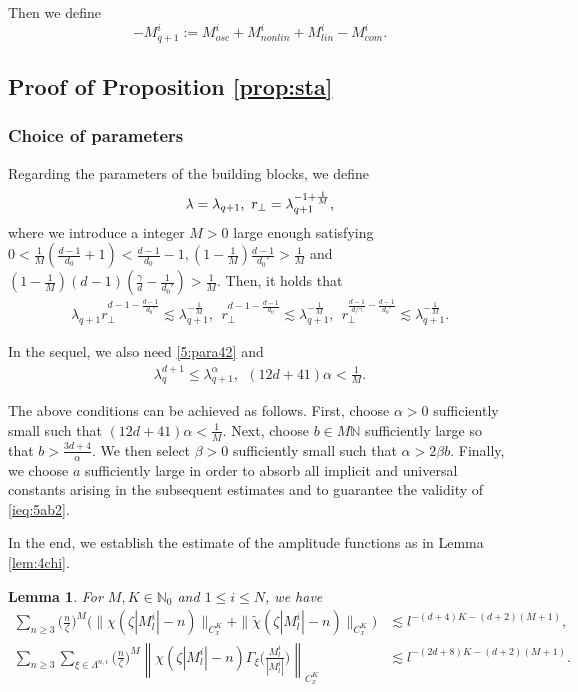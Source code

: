 \documentclass[UTF-8,reqno]{amsart}
\numberwithin{equation}{section}
\newtheorem{lemma}[theorem]{Lemma}
\theoremstyle{definition}
\def\({{\Big(}}
\def\){{\Big)}}
\newcommand{\norm}[1]{\left\|#1\right\|}
\def\geq{\geqslant}
\def\leq{\leqslant}
\def\({{\Big(}}
\def\){{\Big)}}
\def\bl{\begin{lemma}}
\def\el{\end{lemma}}
\def\geq{\geqslant}
\def\leq{\leqslant}
\begin{document}
Then we define 
$$-{M}^i _{q+1}:=M^i_{osc}+M^i_{nonlin}+M^i_{lin}-M^i_{com} .$$ 




\subsection{ Proof of Proposition \ref{prop:sta}}\label{sec:proof1}

\subsubsection{Choice of parameters}\label{sec:5choicepara}

 
Regarding the parameters of the building blocks, we define 
\begin{align}
  \lambda=\lambda_{q+1},\ r_\perp=\lambda_{q+1}^{-1+\frac1{M}}, \notag
\end{align}
where   we introduce a integer $M>0$ large enough  satisfying $0< \frac1M(\frac{d-1}{d_0}+1)<\frac{d-1}{d_0}-1, (1-\frac{1}{M})\frac{d-1}{d_0'}>\frac{1}{M}$ and $(1-\frac{1}{M})(d-1)(\frac{\gamma}{d}-\frac{1}{d_0'})>\frac{1}{M}$.   Then, it holds that 
\begin{align}
    \lambda_{q+1}r_\perp^{d-1-\frac{d-1}{d_0'}}\lesssim \lambda_{q+1}^{-\frac{1}{M}},\  \ r_\perp^{d-1-\frac{d-1}{d_0}}\lesssim\lambda_{q+1}^{-\frac{1}{M}},\ \   r_\perp^{\frac{d-1}{d/\gamma}-\frac{d-1}{d_0'}}\lesssim\lambda_{q+1}^{-\frac1M}.\label{para5lam}
\end{align}
 

In the sequel, we also need \eqref{5:para42} and \begin{align}
   \lambda_{q}^{ d+1}\leq\lambda_{q+1}^\alpha,\ \ (12d+41)\alpha<\frac1M. \label{para55}
 \end{align} 

 The above conditions can be achieved as follows. 
First, choose $\alpha>0$ sufficiently small such that $(12d+41)\alpha<\frac1M.$ Next, choose $b\in M\mathbb{N}$ sufficiently large so that
$b>\frac{3d+4}{\alpha}.$ We then select
$\beta>0$ sufficiently small such that
$\alpha>2\beta b.$ Finally, we choose
$a$ sufficiently large in order to absorb all implicit and universal constants arising in the subsequent estimates and to guarantee the validity of \eqref{ieq:5ab2}.  


 
In the end, we establish the estimate of the amplitude functions  as in Lemma \ref{lem:4chi}.
\bl\label{lem:5chi} 
 For $ M,K\in\mathbb{N}_0$ and $1\leq i\leq N$, we have
\begin{align*}
    \sum_{n\geq3} \(\frac{n}{\zeta }\)^M\(\|\chi(\zeta |M^i_l|-n)\|_{C_{x}^K}+ \|\tilde{\chi}(\zeta |M^i_l|-n)\|_{C_{x}^K}\)&\lesssim l^{- (d+4)K-(d+2)(M+1)},\\
     \sum_{n\geq3}\sum_{\xi\in\Lambda^{n,i}}\(\frac{n}{\zeta }\)^M\norm{\chi(\zeta |M^i_l|-n)\Gamma_\xi\(\frac{M^i_l}{|M^i_l|}\)}_{C_{x}^K}& \lesssim l^{-(2d+8)K-(d+2)(M+1)}.
\end{align*}
\el 
\end{document}
